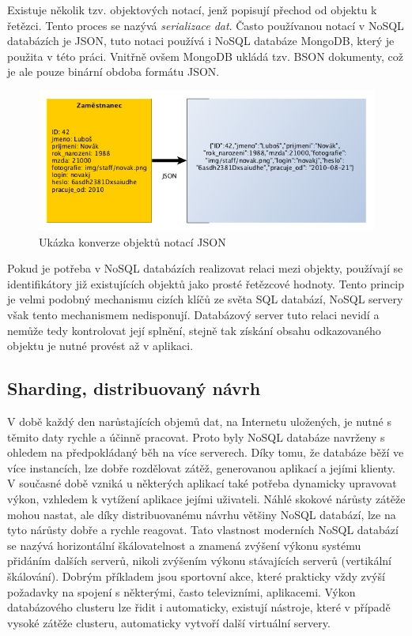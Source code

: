 Existuje několik tzv. objektových notací, jenž popisují přechod od objektu k řetězci. Tento proces se nazývá \emph{serializace dat}. Často používanou notací v NoSQL databázích je JSON, tuto notaci používá i NoSQL databáze MongoDB, který je použita v této práci. Vnitřně ovšem MongoDB ukládá tzv. BSON dokumenty, což je ale pouze binární obdoba formátu JSON.
\begin{figure}[h]
\begin{centering}
\includegraphics[scale=0.5]{obrazky/json-diagram} 
\caption{Ukázka konverze objektů notací JSON}
\end{centering}
\end{figure}

Pokud je potřeba v NoSQL databázích realizovat relaci mezi objekty, používají se identifikátory již existujících objektů jako prosté řetězcové hodnoty. Tento princip je velmi podobný mechanismu cizích klíčů ze světa SQL databází, NoSQL servery však tento mechanismem nedisponují. Databázový server tuto relaci nevidí a nemůže tedy kontrolovat její splnění, stejně tak získání obsahu odkazovaného objektu je nutné provést až v aplikaci.

\subsection{Sharding, distribuovaný návrh}
V době každý den narůstajících objemů dat, na Internetu uložených, je nutné s těmito daty rychle a účinně pracovat. Proto byly NoSQL databáze navrženy s ohledem na předpokládaný běh na více serverech. Díky tomu, že databáze běží ve více instancích, lze dobře rozdělovat zátěž, generovanou aplikací a jejími klienty. V současné době vzniká u některých aplikací také potřeba dynamicky upravovat výkon, vzhledem k vytížení aplikace jejími uživateli. Náhlé skokové nárůsty zátěže mohou nastat, ale díky distribuovanému návrhu většiny NoSQL databází, lze na tyto nárůsty dobře a rychle reagovat. Tato vlastnost moderních NoSQL databází se nazývá horizontální škálovatelnost a znamená zvýšení výkonu systému přidáním dalších serverů, nikoli zvýšením výkonu stávajících serverů (vertikální škálování). Dobrým příkladem jsou sportovní akce, které prakticky vždy zvýší požadavky na spojení s některými, často televizními, aplikacemi. Výkon databázového clusteru lze řidit i automaticky, existují nástroje, které v případě vysoké zátěže clusteru, automaticky vytvoří další virtuální servery.


